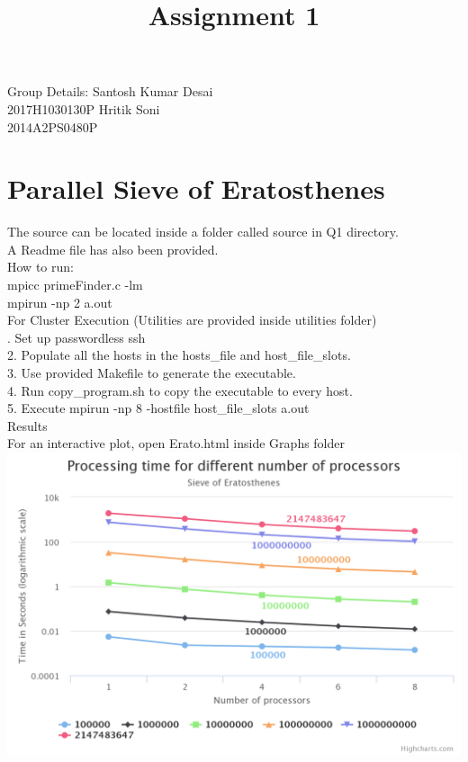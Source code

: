 \documentclass[11pt]{article}
\begin{document}
\title{Assignment 1}
\maketitle

\begin{flushright}

Group Details:
\break
\break
Santosh Kumar Desai
\\
2017H1030130P
\break
\break
Hritik Soni
\\
2014A2PS0480P
\break
\break
\end{flushright}


\section{Parallel Sieve of Eratosthenes}
The source can be located inside a folder called source in Q1 directory.\\
A Readme file has also been provided.\\

\noindent How to run:\\

\noindent mpicc primeFinder.c -lm\\
mpirun -np 2 a.out\\



\noindent For Cluster Execution (Utilities are provided inside utilities folder)\\

. Set up passwordless ssh\\
2. Populate all the hosts in the hosts\_file and host\_file\_slots.\\
3. Use provided Makefile to generate the executable.\\
4. Run copy\_program.sh to copy the executable to every host.\\
5. Execute mpirun -np 8 -hostfile host\_file\_slots a.out \\

\noindent Results\\

\noindent For an interactive plot, open Erato.html inside Graphs folder\\

\includegraphics[width=\textwidth]{Graphs/Sieve.png}
\end{document}

